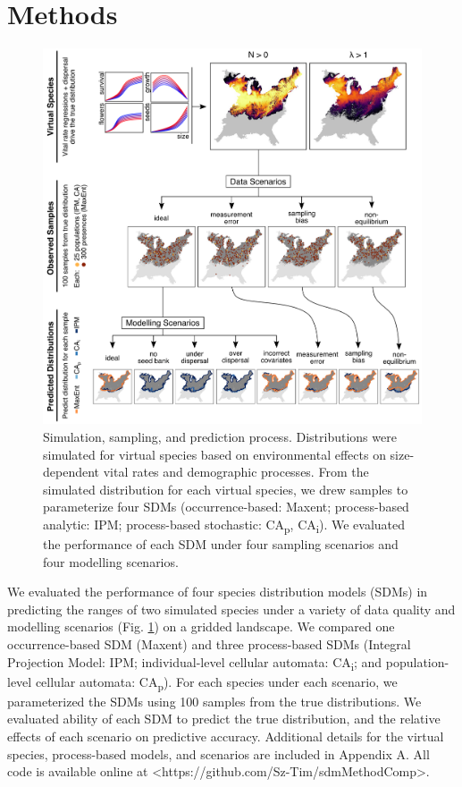 \documentclass[preprint,review,times,12pt]{elsarticle}
\begin{document}
\section{Methods}
\label{S:2}
\begin{figure}
	\centering\includegraphics[width=5in]{figs/process_outline.png}
	\caption{\label{fig:outline} Simulation, sampling, and prediction process. Distributions were simulated for virtual species based on environmental effects on size-dependent vital rates and demographic processes. From the simulated distribution for each virtual species, we drew samples to parameterize four SDMs (occurrence-based: Maxent; process-based analytic: IPM; process-based stochastic: CA\textsubscript{p}, CA\textsubscript{i}). We evaluated the performance of each SDM under four sampling scenarios and four modelling scenarios.}
\end{figure}

We evaluated the performance of four species distribution models (SDMs) in predicting the ranges of two simulated species under a variety of data quality and modelling scenarios (Fig. \ref{fig:outline}) on a gridded landscape. We compared one occurrence-based SDM (Maxent) and three process-based SDMs (Integral Projection Model: IPM; individual-level cellular automata: CA\textsubscript{i}; and population-level cellular automata: CA\textsubscript{p}). For each species under each scenario, we parameterized the SDMs using 100 samples from the true distributions. We evaluated ability of each SDM to predict the true distribution, and the relative effects of each scenario on predictive accuracy. Additional details for the virtual species, process-based models, and scenarios are included in Appendix A. All code is available online at \textless https://github.com/Sz-Tim/sdmMethodComp\textgreater.
\end{document}
